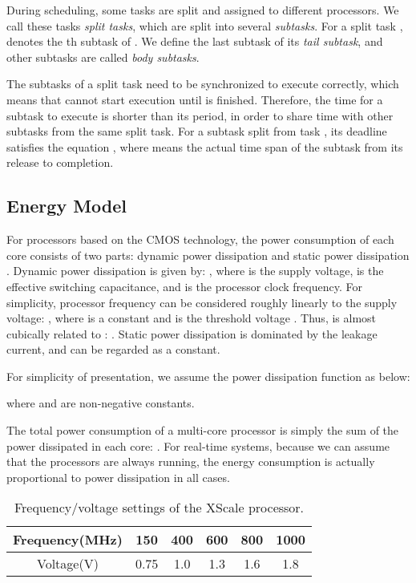\documentclass[12pt, journal,compsoc]{IEEEtran}
\begin{document}
During scheduling, some tasks are split and assigned to different processors. We call these tasks \emph{split tasks}, which are split into several \emph{subtasks}. For a split task ,  denotes the th subtask of . We define the last subtask of  its \emph{tail subtask}, and other subtasks are called \emph{body subtasks}.

The subtasks of a split task need to be synchronized to execute correctly, which means that  cannot start execution until  is finished. Therefore, the time for a subtask  to execute is shorter than its period, in order to share time with other subtasks from the same split task. For a subtask  split from task , its deadline  satisfies the equation , where  means the actual time span of the subtask from its release to completion.

\subsection{Energy Model}
For processors based on the CMOS technology, the power consumption of each core  consists of two parts: dynamic power dissipation  and static power dissipation . Dynamic power dissipation  is given by: , where  is the supply voltage,  is the effective switching capacitance, and  is the processor clock frequency. For simplicity, processor frequency can be considered roughly linearly to the supply voltage: , where  is a constant and  is the threshold voltage \cite{Chandrakasan95lowpower}. Thus,  is almost cubically related to : . Static power dissipation  is dominated by the leakage current, and can be regarded as a constant.


For simplicity of presentation, we assume the power dissipation function as below:



where  and  are non-negative constants.

The total power consumption of a multi-core processor is simply the sum of the power dissipated in each core: . For real-time systems, because we can assume that the processors are always running, the energy consumption is actually proportional to power dissipation in all cases.

\begin{table}[!t]
\renewcommand{\arraystretch}{1.3}
\caption{Frequency/voltage settings of the XScale processor.}
\label{fp}
\centering
\begin{tabular}{|c||c|c|c|c|c|}
\hline
Frequency(MHz) & 150 & 400 & 600 & 800 & 1000\\
\hline
Voltage(V) & 0.75 & 1.0 & 1.3 & 1.6 & 1.8\\
\hline
\end{tabular}
\end{table}
\end{document}
